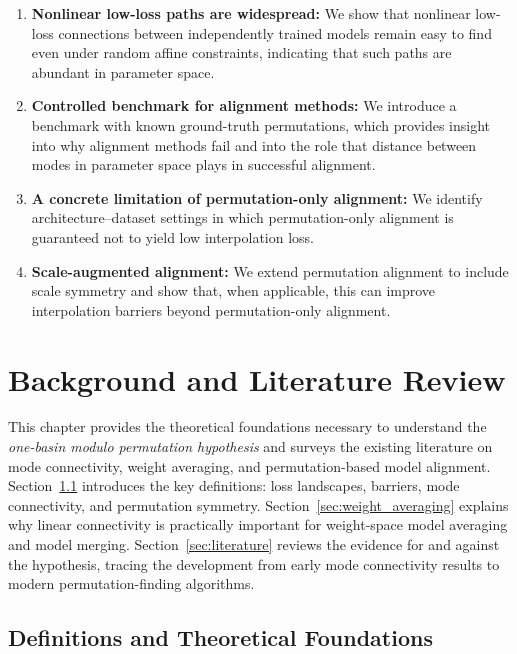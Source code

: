\documentclass[11pt,a4paper]{report}
\begin{document}
\begin{enumerate}
    \item \textbf{Nonlinear low-loss paths are widespread:} We show that nonlinear low-loss connections between independently trained models remain easy to find even under random affine constraints, indicating that such paths are abundant in parameter space.
    
    \item \textbf{Controlled benchmark for alignment methods:} We introduce a benchmark with known ground-truth permutations, which provides insight into why alignment methods fail and into the role that distance between modes in parameter space plays in successful alignment.

    \item \textbf{A concrete limitation of permutation-only alignment:} We identify architecture--dataset settings in which permutation-only alignment is guaranteed not to yield low interpolation loss.

    \item \textbf{Scale-augmented alignment:} We extend permutation alignment to include scale symmetry and show that, when applicable, this can improve interpolation barriers beyond permutation-only alignment.
\end{enumerate}


\chapter{Background and Literature Review}

This chapter provides the theoretical foundations necessary to understand the 
\textit{one-basin modulo permutation hypothesis} and surveys the existing 
literature on mode connectivity, weight averaging, and permutation-based model 
alignment. Section~\ref{sec:definitions} introduces the key definitions: loss 
landscapes, barriers, mode connectivity, and permutation symmetry. 
Section~\ref{sec:weight_averaging} explains why linear connectivity is practically 
important for weight-space model averaging and model merging. 
Section~\ref{sec:literature} reviews the evidence for and against the hypothesis, 
tracing the development from early mode connectivity results to modern 
permutation-finding algorithms.

\section{Definitions and Theoretical Foundations}
\label{sec:definitions} 
\end{document}
